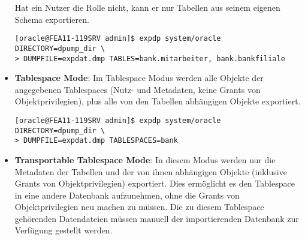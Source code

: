 \begin{itemize}
          Hat ein Nutzer die Rolle  nicht, kann er nur Tabellen aus seinem eigenen Schema exportieren.
          \begin{lstlisting}[caption={Table Export},label=admin903,language=expdp_impdp,emph={[9]DIRECTORY, TABLES},emphstyle={[9]\sffamily\color{blue}}]
[oracle@FEA11-119SRV admin]$ expdp system/oracle DIRECTORY=dpump_dir \
> DUMPFILE=expdat.dmp TABLES=bank.mitarbeiter, bank.bankfiliale
          \end{lstlisting}
          \item \textbf{Tablespace Mode}: Im Tablespace Modus werden alle Objekte der angegebenen Tablespaces (Nutz- und Metadaten, keine Grants von Objektprivilegien), plus alle von den Tabellen abhängigen Objekte exportiert.
          \begin{lstlisting}[caption={Tablespace Export},label=admin904,language=expdp_impdp,emph={[9]DIRECTORY},emphstyle={[9]\sffamily\color{blue}}]
[oracle@FEA11-119SRV admin]$ expdp system/oracle DIRECTORY=dpump_dir \
> DUMPFILE=expdat.dmp TABLESPACES=bank
          \end{lstlisting}
          \item \textbf{Transportable Tablespace Mode}: In diesem Modus werden nur die Metadaten der Tabellen und der von ihnen abhängigen Objekte (inklusive Grants von Objektprivilegien) exportiert. Dies ermöglicht es den Tablespace in eine andere Datenbank aufzunehmen, ohne die Grants von Objektprivilegien neu machen zu müssen. Die zu diesem Tablespace gehörenden Datendateien müssen manuell der importierenden Datenbank zur Verfügung gestellt werden.


\end{itemize}
